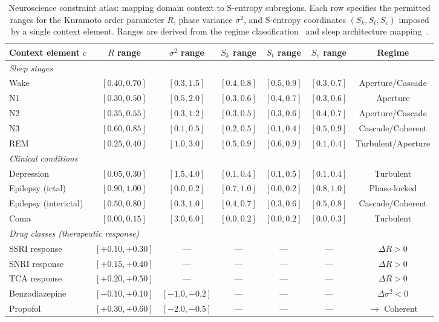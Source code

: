 \documentclass[aps,prd,twocolumn,superscriptaddress,floatfix,nofootinbib]{revtex4-2}
\theoremstyle{remark}
\newcommand{\Sk}{S_k}
\newcommand{\St}{S_t}
\newcommand{\Se}{S_e}
\begin{document}
\begin{table}[!htbp]
\centering
\caption{Neuroscience constraint atlas: mapping domain context to S-entropy subregions.
Each row specifies the permitted ranges for the Kuramoto order parameter $R$, phase variance $\sigma^2$, and S-entropy coordinates $(\Sk, \St, \Se)$ imposed by a single context element.
Ranges are derived from the regime classification~\cite{sachikonye2026regime} and sleep architecture mapping~\cite{sachikonye2026regime,hobson2002cognitive,carskadon2011monitoring}.}
\label{tab:constraint_atlas}
\begin{tabular}{lcccccc}
\toprule
Context element $c$ & $R$ range & $\sigma^2$ range & $\Sk$ range & $\St$ range & $\Se$ range & Regime \\
\midrule
\multicolumn{7}{l}{\emph{Sleep stages}} \\
Wake     & $[0.40, 0.70]$ & $[0.3, 1.5]$ & $[0.4, 0.8]$ & $[0.5, 0.9]$ & $[0.3, 0.7]$ & Aperture/Cascade \\
N1       & $[0.30, 0.50]$ & $[0.5, 2.0]$ & $[0.3, 0.6]$ & $[0.4, 0.7]$ & $[0.3, 0.6]$ & Aperture \\
N2       & $[0.35, 0.55]$ & $[0.3, 1.2]$ & $[0.3, 0.5]$ & $[0.3, 0.6]$ & $[0.4, 0.7]$ & Aperture/Cascade \\
N3       & $[0.60, 0.85]$ & $[0.1, 0.5]$ & $[0.2, 0.5]$ & $[0.1, 0.4]$ & $[0.5, 0.9]$ & Cascade/Coherent \\
REM      & $[0.25, 0.40]$ & $[1.0, 3.0]$ & $[0.5, 0.9]$ & $[0.6, 0.9]$ & $[0.1, 0.4]$ & Turbulent/Aperture \\
\midrule
\multicolumn{7}{l}{\emph{Clinical conditions}} \\
Depression          & $[0.05, 0.30]$ & $[1.5, 4.0]$ & $[0.1, 0.4]$ & $[0.1, 0.5]$ & $[0.1, 0.4]$ & Turbulent \\
Epilepsy (ictal)    & $[0.90, 1.00]$ & $[0.0, 0.2]$ & $[0.7, 1.0]$ & $[0.0, 0.2]$ & $[0.8, 1.0]$ & Phase-locked \\
Epilepsy (interictal) & $[0.50, 0.80]$ & $[0.3, 1.0]$ & $[0.4, 0.7]$ & $[0.3, 0.6]$ & $[0.5, 0.8]$ & Cascade/Coherent \\
Coma               & $[0.00, 0.15]$ & $[3.0, 6.0]$ & $[0.0, 0.2]$ & $[0.0, 0.2]$ & $[0.0, 0.3]$ & Turbulent \\
\midrule
\multicolumn{7}{l}{\emph{Drug classes (therapeutic response)}} \\
SSRI response       & $[+0.10, +0.30]$ & --- & --- & --- & --- & $\Delta R > 0$ \\
SNRI response       & $[+0.15, +0.40]$ & --- & --- & --- & --- & $\Delta R > 0$ \\
TCA response        & $[+0.20, +0.50]$ & --- & --- & --- & --- & $\Delta R > 0$ \\
Benzodiazepine      & $[-0.10, +0.10]$ & $[-1.0, -0.2]$ & --- & --- & --- & $\Delta\sigma^2 < 0$ \\
Propofol            & $[+0.30, +0.60]$ & $[-2.0, -0.5]$ & --- & --- & --- & $\to$ Coherent \\
\bottomrule
\end{tabular}
\end{table}
\end{document}
